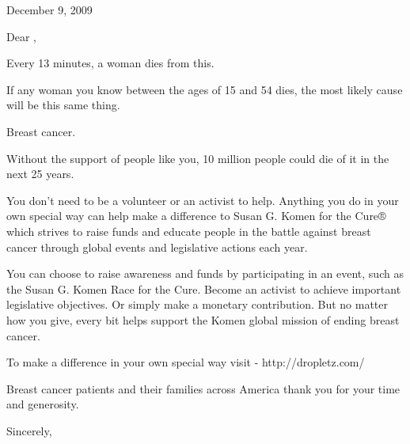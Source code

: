 \documentclass[10pt]{letter}
\begin{document}
\date {}

\begin{letter}{  }   
                           
 \newline \newline
December 9, 2009

\opening{Dear ,}


Every 13 minutes, a woman dies from this. 

If any woman you know between the ages of 15 and 54 dies, the most likely cause will be this same thing.

Breast cancer.

Without the support of people like you, 10 million people could die of it in the next 25 years.

You don't need to be a volunteer or an activist to help.  Anything you do in your own special way can help make a difference to Susan G. Komen for the Cure® which strives to raise funds and educate people in the battle against breast cancer through global events and legislative actions each year.

You can choose to raise awareness and funds by participating in an event, such as the Susan G. Komen Race for the Cure. Become an activist to achieve important legislative objectives. Or simply make a monetary contribution. But no matter how you give, every bit helps support the Komen global mission of ending breast cancer.

To make a difference in your own special way visit  - http://dropletz.com/

Breast cancer patients and their families across America thank you for your time and generosity.

\closing{Sincerely,}
\end{letter}
\end{document}
